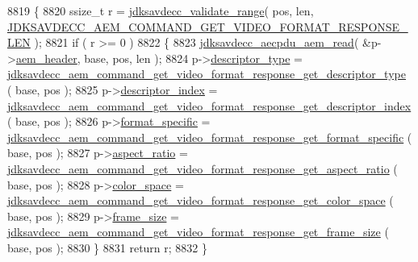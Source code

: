 \begin{DoxyCode}
8819 \{
8820     ssize\_t r = \hyperlink{group__util_ga9c02bdfe76c69163647c3196db7a73a1}{jdksavdecc\_validate\_range}( pos, len, 
      \hyperlink{group__command__get__video__format__response_ga3c3c55996e07f58797672156ffdd17cf}{JDKSAVDECC\_AEM\_COMMAND\_GET\_VIDEO\_FORMAT\_RESPONSE\_LEN} );
8821     \textcolor{keywordflow}{if} ( r >= 0 )
8822     \{
8823         \hyperlink{group__aecpdu__aem_gae2421015dcdce745b4f03832e12b4fb6}{jdksavdecc\_aecpdu\_aem\_read}( &p->\hyperlink{structjdksavdecc__aem__command__get__video__format__response_ae1e77ccb75ff5021ad923221eab38294}{aem\_header}, base, pos, len );
8824         p->\hyperlink{structjdksavdecc__aem__command__get__video__format__response_ab7c32b6c7131c13d4ea3b7ee2f09b78d}{descriptor\_type} = 
      \hyperlink{group__command__get__video__format__response_ga7ae8e544fb2e43c27b5c3ec61dd3f9b1}{jdksavdecc\_aem\_command\_get\_video\_format\_response\_get\_descriptor\_type}
      ( base, pos );
8825         p->\hyperlink{structjdksavdecc__aem__command__get__video__format__response_a042bbc76d835b82d27c1932431ee38d4}{descriptor\_index} = 
      \hyperlink{group__command__get__video__format__response_ga0e021f1956625ac8bb870b6e95929fa9}{jdksavdecc\_aem\_command\_get\_video\_format\_response\_get\_descriptor\_index}
      ( base, pos );
8826         p->\hyperlink{structjdksavdecc__aem__command__get__video__format__response_acbfc36b550978f88cf0a3d9d2b2ce0dd}{format\_specific} = 
      \hyperlink{group__command__get__video__format__response_ga913ab2795ccf555f826d2656e50d2bb1}{jdksavdecc\_aem\_command\_get\_video\_format\_response\_get\_format\_specific}
      ( base, pos );
8827         p->\hyperlink{structjdksavdecc__aem__command__get__video__format__response_aa2976b5991e88ce43c451d2683d5f329}{aspect\_ratio} = 
      \hyperlink{group__command__get__video__format__response_ga118dba39d72903a46a3b8394f396878b}{jdksavdecc\_aem\_command\_get\_video\_format\_response\_get\_aspect\_ratio}
      ( base, pos );
8828         p->\hyperlink{structjdksavdecc__aem__command__get__video__format__response_a5f1234a863bb834ff7c110509884d228}{color\_space} = 
      \hyperlink{group__command__get__video__format__response_ga6e25aee231d1c8c8a546ed7fc11e3ed9}{jdksavdecc\_aem\_command\_get\_video\_format\_response\_get\_color\_space}
      ( base, pos );
8829         p->\hyperlink{structjdksavdecc__aem__command__get__video__format__response_a0229abcfe4414f86dcf52c5ebf84311c}{frame\_size} = 
      \hyperlink{group__command__get__video__format__response_ga07684eb406861581e8ccdb4b4ceb8d89}{jdksavdecc\_aem\_command\_get\_video\_format\_response\_get\_frame\_size}
      ( base, pos );
8830     \}
8831     \textcolor{keywordflow}{return} r;
8832 \}
\end{DoxyCode}


